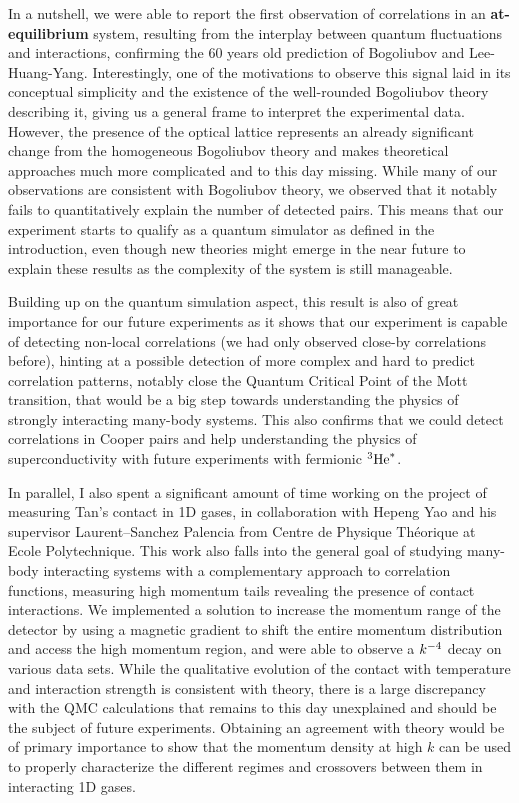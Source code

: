 In a nutshell, we were able to report the first observation of \kmk correlations in an \textbf{at-equilibrium} system, resulting from the interplay between quantum fluctuations and interactions, confirming the 60 years old prediction of Bogoliubov and Lee-Huang-Yang. Interestingly, one of the motivations to observe this signal laid in its conceptual simplicity and the existence of the well-rounded Bogoliubov theory describing it, giving us a general frame to interpret the experimental data. However, the presence of the optical lattice represents an already significant change from the homogeneous Bogoliubov theory and makes theoretical approaches much more complicated and to this day missing. While many of our observations are consistent with Bogoliubov theory, we observed that it notably fails to quantitatively explain the number of detected pairs. This means that our experiment starts to qualify as a quantum simulator as defined in the introduction, even though new theories might emerge in the near future to explain these results as the complexity of the system is still manageable. 

Building up on the quantum simulation aspect, this result is also of great importance for our future experiments as it shows that our experiment is capable of detecting non-local \kmk correlations (we had only observed close-by \kk correlations before), hinting at a possible detection of more complex and hard to predict correlation patterns, notably close the Quantum Critical Point of the Mott transition, that would be a big step towards understanding the physics of strongly interacting many-body systems. This also confirms that we could detect \kmk correlations in Cooper pairs and help understanding the physics of superconductivity with future experiments with fermionic $^3 \rm{He}^*$.

In parallel, I also spent a significant amount of time working on the project of measuring Tan's contact in 1D gases, in collaboration with Hepeng Yao and his supervisor Laurent--Sanchez Palencia from Centre de Physique Théorique at Ecole Polytechnique. This work also falls into the general goal of studying many-body interacting systems with a complementary approach to correlation functions, \ie measuring high momentum tails revealing the presence of contact interactions. We implemented a solution to increase the momentum range of the detector by using a magnetic gradient to shift the entire momentum distribution and access the high momentum region, and were able to observe a $k^{-4}$ decay on various data sets. While the qualitative evolution of the contact with temperature and interaction strength is consistent with theory, there is a large discrepancy with the QMC calculations that remains to this day unexplained and should be the subject of future experiments. Obtaining an agreement with theory would be of primary importance to show that the momentum density at high $k$ can be used to properly characterize the different regimes and crossovers between them in interacting 1D gases.

